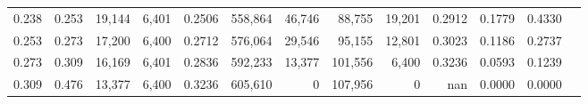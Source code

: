 \begin{tabular}{rrrrrrrrrrrrr}
0.238 & 0.253 & 19,144 & 6,401 &                                     0.2506 & 558,864 &  46,746 &  88,755 &  19,201 & 0.2912 & 0.1779 & 0.4330 \\
0.253 & 0.273 & 17,200 & 6,400 &                                     0.2712 & 576,064 &  29,546 &  95,155 &  12,801 & 0.3023 & 0.1186 & 0.2737 \\
0.273 & 0.309 & 16,169 & 6,401 &                                     0.2836 & 592,233 &  13,377 & 101,556 &   6,400 & 0.3236 & 0.0593 & 0.1239 \\
0.309 & 0.476 & 13,377 & 6,400 &                                     0.3236 & 605,610 &       0 & 107,956 &       0 &    nan & 0.0000 & 0.0000 \\
\bottomrule
\end{tabular}
